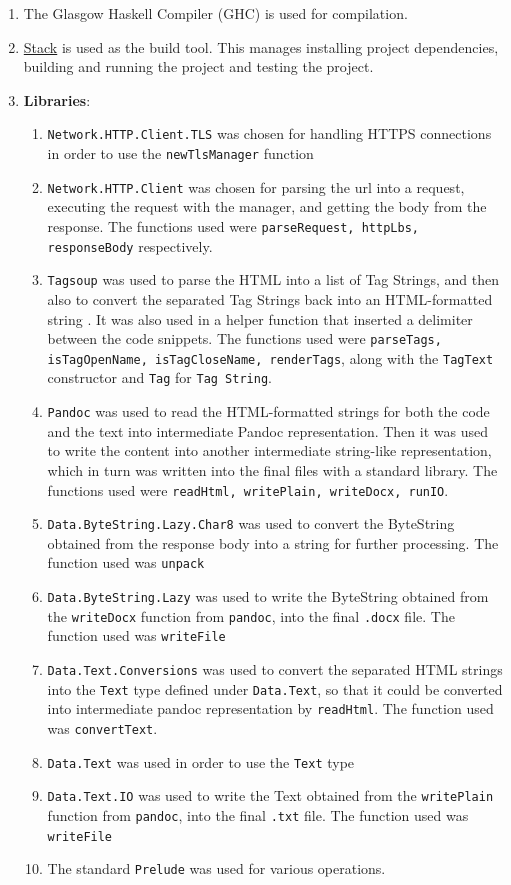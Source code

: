 \documentclass{scrreprt}
\begin{document}
\begin{enumerate}
    \item The Glasgow Haskell Compiler (GHC) is used for compilation.
    \item \href{https://docs.haskellstack.org/en/stable/}{Stack} is used as the build tool. This manages installing project dependencies, building and running the project and testing the project.
    \item \textbf{Libraries}:
    \begin{enumerate}
        \item \texttt{Network.HTTP.Client.TLS} was chosen for handling HTTPS connections in order to use the \texttt{newTlsManager} function
        \item \texttt{Network.HTTP.Client} was chosen for parsing the url into a request, executing the request with the manager, and getting the body from the response. The functions used were \texttt{parseRequest, httpLbs, responseBody} respectively.
        \item \texttt{Tagsoup} was used to parse the HTML into a list of Tag Strings, and then also to convert the separated Tag Strings back into an HTML-formatted string . It was also used in a helper function that inserted a delimiter between the code snippets. The functions used were \texttt{parseTags, isTagOpenName, isTagCloseName, renderTags}, along with the \texttt{TagText} constructor and \texttt{Tag} for \texttt{Tag String}.
        \item \texttt{Pandoc} was used to read the HTML-formatted strings for both the code and the text into intermediate Pandoc representation. Then it was used to write the content into another intermediate string-like representation, which in turn was written into the final files with a standard library. The functions used were \texttt{readHtml, writePlain, writeDocx, runIO}.
        \item \texttt{Data.ByteString.Lazy.Char8} was used to convert the ByteString obtained from the response body into a string for further processing. The function used was \texttt{unpack}
        \item \texttt{Data.ByteString.Lazy} was used to write the ByteString obtained from the \texttt{writeDocx} function from \texttt{pandoc}, into the final \texttt{.docx} file. The function used was \texttt{writeFile}
        \item \texttt{Data.Text.Conversions} was used to convert the separated HTML strings into the \texttt{Text} type defined under \texttt{Data.Text}, so that it could be converted into intermediate pandoc representation by \texttt{readHtml}. The function used was \texttt{convertText}.
        \item \texttt{Data.Text} was used in order to use the \texttt{Text} type
        \item \texttt{Data.Text.IO} was used to write the Text obtained from the \texttt{writePlain} function from \texttt{pandoc}, into the final \texttt{.txt} file. The function used was \texttt{writeFile}
        \item The standard \texttt{Prelude} was used for various operations.
    \end{enumerate} 
\end{enumerate}
\end{document}
